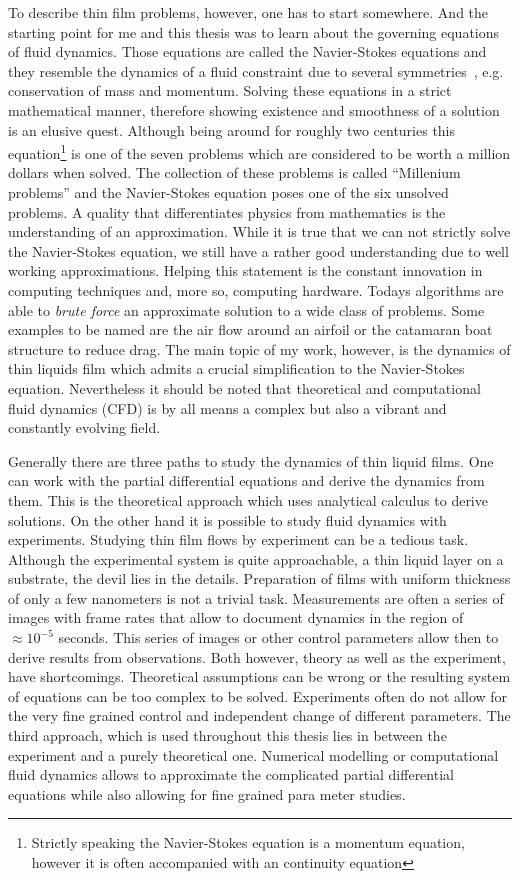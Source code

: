 To describe thin film problems, however, one has to start somewhere.
And the starting point for me and this thesis was to learn about the governing equations of fluid dynamics. 
Those equations are called the Navier-Stokes equations and they resemble the dynamics of a fluid constraint due to several symmetries~\cite{Navier, Stokes}, e.g. conservation of mass and momentum.
Solving these equations in a strict mathematical manner, therefore showing existence and smoothness of a solution is an elusive quest. 
Although being around for roughly two centuries this equation\footnote{Strictly speaking the Navier-Stokes equation is a momentum equation, however it is often accompanied with an continuity equation} is one of the seven problems which are considered to be worth a million dollars when solved. 
The collection of these problems is called ``Millenium problems'' and the Navier-Stokes equation poses one of the six unsolved problems.
A quality that differentiates physics from mathematics is the understanding of an approximation.
While it is true that we can not strictly solve the Navier-Stokes equation, we still have a rather good understanding due to well working approximations.
Helping this statement is the constant innovation in computing techniques and, more so, computing hardware. 
Todays algorithms are able to \textit{brute force} an approximate solution to a wide class of problems.  
Some examples to be named are the air flow around an airfoil or the catamaran boat structure to reduce drag. 
The main topic of my work, however, is the dynamics of thin liquids film which admits a crucial simplification to the Navier-Stokes equation. 
Nevertheless it should be noted that theoretical and computational fluid dynamics (CFD) is by all means a complex but also a vibrant and constantly evolving field.

Generally there are three paths to study the dynamics of thin liquid films.
One can work with the partial differential equations and derive the dynamics from them. 
This is the theoretical approach which uses analytical calculus to derive solutions.
On the other hand it is possible to study fluid dynamics with experiments.
Studying thin film flows by experiment can be a tedious task.
Although the experimental system is quite approachable, a thin liquid layer on a substrate, the devil lies in the details.
Preparation of films with uniform thickness of only a few nanometers is not a trivial task.
Measurements are often a series of images with frame rates that allow to document dynamics in the region of $\approx 10^{-5}$ seconds.
This series of images or other control parameters allow then to derive results from observations.
Both however, theory as well as the experiment, have shortcomings. 
Theoretical assumptions can be wrong or the resulting system of equations can be too complex to be solved. 
Experiments often do not allow for the very fine grained control and independent change of different parameters.
The third approach, which is used throughout this thesis lies in between the experiment and a purely theoretical one.
Numerical modelling or computational fluid dynamics allows to approximate the complicated partial differential equations while also allowing for fine grained para  meter studies.

